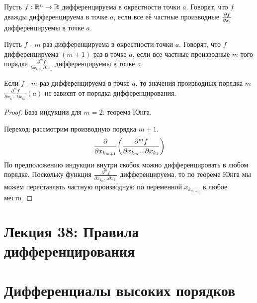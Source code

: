     \begin{definition}
    	Пусть $f : \mathbb R^n \rightarrow \mathbb R$ дифференцируема в окрестности точки $a$. Говорят, что $f$ дважды дифференцируема в точке $a$, если все её частные производные $\pdv{f}{x_i}$ дифференцируемы в точке $a$. 
    	
    	Пусть $f$ - $m$ раз дифференцируема в окрестности точки $a$. Говорят, что $f$ дифференцируема $(m + 1)$ раз в точке $a$, если все частные производные $m$-того порядка $\frac{\partial^m f}{\partial x_{i_1} ... \partial x_{i_m}}$ дифференцируемы в точке $a$.
    \end{definition}
    
    \begin{corollary}
    	Если $f$ - $m$ раз дифференцируема в точке $a$, то значения производных порядка $m$  $\frac{\partial^m f}{\partial x_{i_1} ... \partial x_{i_m}}(a)$ не зависят от порядка дифференцирования.
    \end{corollary}
    
    \begin{proof}
    	База индукции для $m = 2$: теорема Юнга.
    	
    	Переход: рассмотрим производную порядка $m + 1$.
    	\[ \frac{\partial }{\partial x_{k_{m + 1}}} \bigg(\frac{\partial^m f}{\partial x_{k_m} ... \partial x_{k_1}}\bigg) \]
    	По предположению индукции внутри скобок можно дифференцировать в любом порядке. Поскольку функция $\frac{\partial^m f}{\partial x_{k_m} ... \partial x_{k_1}}$ дифференцируема, то по теореме Юнга мы можем переставлять частную производную по переменной $x_{k_{m + 1}}$ в любое место.
    \end{proof}
    
    \newpage
    
    \section*{Лекция 38: Правила дифференцирования}
    
    \section{Дифференциалы высоких порядков}
    
